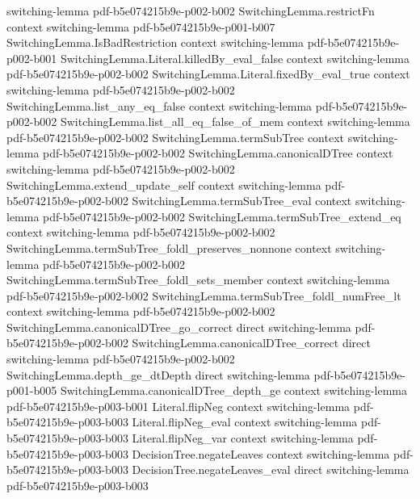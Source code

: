 \begin{lemma}
  {switching-lemma}
  {pdf-b5e074215b9e-p002-b002}
\proofstep
  {SwitchingLemma.restrictFn}
  {context}
  {switching-lemma}
  {pdf-b5e074215b9e-p001-b007}
\proofstep
  {SwitchingLemma.IsBadRestriction}
  {context}
  {switching-lemma}
  {pdf-b5e074215b9e-p002-b001}
\proofstep
  {SwitchingLemma.Literal.killedBy_eval_false}
  {context}
  {switching-lemma}
  {pdf-b5e074215b9e-p002-b002}
\proofstep
  {SwitchingLemma.Literal.fixedBy_eval_true}
  {context}
  {switching-lemma}
  {pdf-b5e074215b9e-p002-b002}
\proofstep
  {SwitchingLemma.list_any_eq_false}
  {context}
  {switching-lemma}
  {pdf-b5e074215b9e-p002-b002}
\proofstep
  {SwitchingLemma.list_all_eq_false_of_mem}
  {context}
  {switching-lemma}
  {pdf-b5e074215b9e-p002-b002}
\proofstep
  {SwitchingLemma.termSubTree}
  {context}
  {switching-lemma}
  {pdf-b5e074215b9e-p002-b002}
\proofstep
  {SwitchingLemma.canonicalDTree}
  {context}
  {switching-lemma}
  {pdf-b5e074215b9e-p002-b002}
\proofstep
  {SwitchingLemma.extend_update_self}
  {context}
  {switching-lemma}
  {pdf-b5e074215b9e-p002-b002}
\proofstep
  {SwitchingLemma.termSubTree_eval}
  {context}
  {switching-lemma}
  {pdf-b5e074215b9e-p002-b002}
\proofstep
  {SwitchingLemma.termSubTree_extend_eq}
  {context}
  {switching-lemma}
  {pdf-b5e074215b9e-p002-b002}
\proofstep
  {SwitchingLemma.termSubTree_foldl_preserves_nonnone}
  {context}
  {switching-lemma}
  {pdf-b5e074215b9e-p002-b002}
\proofstep
  {SwitchingLemma.termSubTree_foldl_sets_member}
  {context}
  {switching-lemma}
  {pdf-b5e074215b9e-p002-b002}
\proofstep
  {SwitchingLemma.termSubTree_foldl_numFree_lt}
  {context}
  {switching-lemma}
  {pdf-b5e074215b9e-p002-b002}
\proofstep
  {SwitchingLemma.canonicalDTree_go_correct}
  {direct}
  {switching-lemma}
  {pdf-b5e074215b9e-p002-b002}
\proofstep
  {SwitchingLemma.canonicalDTree_correct}
  {direct}
  {switching-lemma}
  {pdf-b5e074215b9e-p002-b002}
\proofstep
  {SwitchingLemma.depth_ge_dtDepth}
  {direct}
  {switching-lemma}
  {pdf-b5e074215b9e-p001-b005}
\proofstep
  {SwitchingLemma.canonicalDTree_depth_ge}
  {context}
  {switching-lemma}
  {pdf-b5e074215b9e-p003-b001}
\proofstep
  {Literal.flipNeg}
  {context}
  {switching-lemma}
  {pdf-b5e074215b9e-p003-b003}
\proofstep
  {Literal.flipNeg_eval}
  {context}
  {switching-lemma}
  {pdf-b5e074215b9e-p003-b003}
\proofstep
  {Literal.flipNeg_var}
  {context}
  {switching-lemma}
  {pdf-b5e074215b9e-p003-b003}
\proofstep
  {DecisionTree.negateLeaves}
  {context}
  {switching-lemma}
  {pdf-b5e074215b9e-p003-b003}
\proofstep
  {DecisionTree.negateLeaves_eval}
  {direct}
  {switching-lemma}
  {pdf-b5e074215b9e-p003-b003}

\end{lemma}
